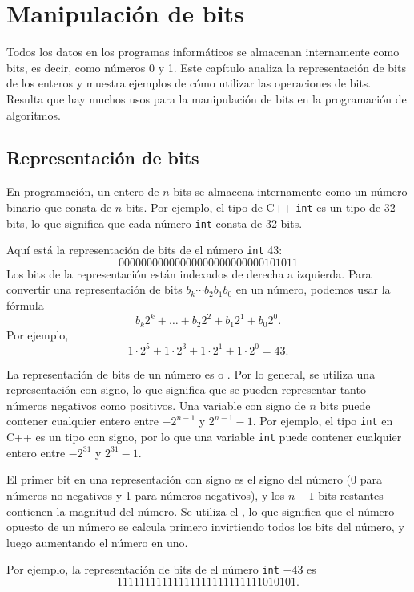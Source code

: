 \chapter{Manipulación de bits}

Todos los datos en los programas informáticos se almacenan internamente como bits,
es decir, como números 0 y 1.
Este capítulo analiza la representación de bits
de los enteros y muestra ejemplos
de cómo utilizar las operaciones de bits.
Resulta que hay muchos usos para
la manipulación de bits en la programación de algoritmos.

\section{Representación de bits}


En programación, un entero de $n$ bits se almacena internamente
como un número binario que consta de $n$ bits.
Por ejemplo, el tipo de C++ \texttt{int} es
un tipo de 32 bits, lo que significa que cada número \texttt{int}
consta de 32 bits.

Aquí está la representación de bits de
el número \texttt{int} 43:
\[00000000000000000000000000101011\]
Los bits de la representación están indexados de derecha a izquierda.
Para convertir una representación de bits $b_k \cdots b_2 b_1 b_0$ en un número,
podemos usar la fórmula
\[b_k 2^k + \ldots + b_2 2^2 + b_1 2^1 + b_0 2^0.\]
Por ejemplo,
\[1 \cdot 2^5 + 1 \cdot 2^3 + 1 \cdot 2^1 + 1 \cdot 2^0 = 43.\]

La representación de bits de un número es
 o .
Por lo general, se utiliza una representación con signo,
lo que significa que se pueden representar tanto números negativos como positivos.
Una variable con signo de $n$ bits puede contener cualquier
entero entre $-2^{n-1}$ y $2^{n-1}-1$.
Por ejemplo, el tipo \texttt{int} en C++ es
un tipo con signo, por lo que una variable \texttt{int} puede contener cualquier
entero entre $-2^{31}$ y $2^{31}-1$.

El primer bit en una representación con signo
es el signo del número (0 para números no negativos
y 1 para números negativos), y
los $n-1$ bits restantes contienen la magnitud del número.
Se utiliza el , lo que significa que el
número opuesto de un número se calcula primero
invirtiendo todos los bits del número,
y luego aumentando el número en uno.

Por ejemplo, la representación de bits de
el número \texttt{int} $-43$ es
\[11111111111111111111111111010101.\]

